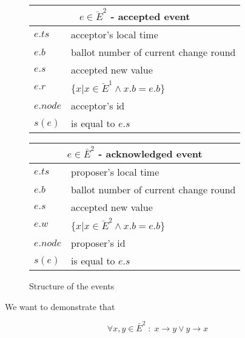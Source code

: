 \documentclass[a4paper,USenglish]{lipics-v2018}
\theoremstyle{definition}
\begin{document}
\begin{figure}[!h]
    \begin{minipage}{0.47\textwidth}
        \centering
        \begin{tabular}{|p{1cm}|p{4cm}|}
            \hline
            \multicolumn{2}{|c|}{$e \in \ddot{E}^2$ - accepted event}\\
            \hline
            $e.ts$ & acceptor's local time\\
            \hline
            $e.b$ & ballot number of current change round\\
            \hline
            $e.s$ & accepted new value\\
            \hline
            $e.r$ & $\{ x | x \in \ddot{E}^1 \land x.b = e.b \}$\\
            \hline
            $e.node$ & acceptor's id\\
            \hline
            \hline
            $s(e)$ & is equal to $e.s$\\
            \hline
        \end{tabular}
    \end{minipage}
    \hspace{\fill} %
    \begin{minipage}{0.47\textwidth}
        \centering
        \begin{tabular}{|p{1cm}|p{4cm}|}
            \hline
            \multicolumn{2}{|c|}{$e \in \bar{E}^2$ - acknowledged event}\\
            \hline
            $e.ts$ & proposer's local time\\
            \hline
            $e.b$ & ballot number of current change round\\
            \hline
            $e.s$ & accepted new value\\
            \hline
            $e.w$ & $\{ x | x \in \ddot{E}^2 \land x.b = e.b \}$\\
            \hline
            $e.node$ & proposer's id\\
            \hline
            \hline
            $s(e)$ & is equal to $e.s$\\
            \hline
        \end{tabular}
    \end{minipage}

    \caption{Structure of the events}
\end{figure}

We want to demonstrate that

\begin{equation}
    \forall x,y \in \bar{E}^2 \;:\; x \to y \lor y \to x
\end{equation}
\end{document}

